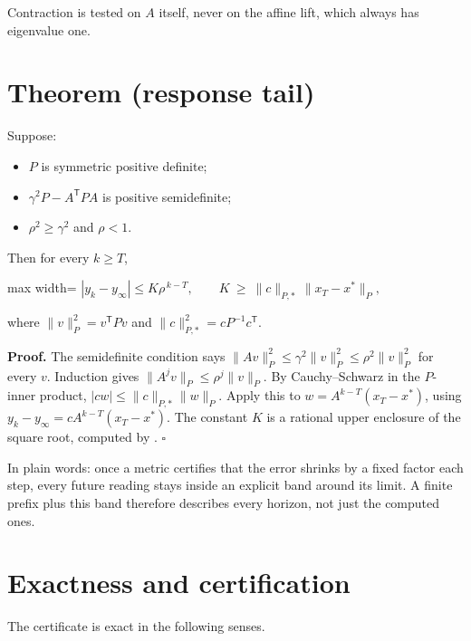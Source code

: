 \documentclass[
  11pt,
  a4paper,
]{report}
\providecommand{\tightlist}{%
  \setlength{\itemsep}{0pt}\setlength{\parskip}{0pt}}
\let\singularitytexttt\texttt
\renewcommand{\texttt}[1]{\singularitytexttt{\seqsplit{#1}}}
\begin{document}
Contraction is tested on \(A\) itself, never on the affine lift, which
always has eigenvalue one.

\hypertarget{theorem-response-tail}{%
\section{Theorem (response tail)}\label{theorem-response-tail}}

Suppose:

\begin{itemize}
\tightlist
\item
  \(P\) is symmetric positive definite;
\item
  \(\gamma^2P-A^{\mathsf T}PA\) is positive semidefinite;
\item
  \(\rho^2\ge\gamma^2\) and \(\rho<1\).
\end{itemize}

Then for every \(k\ge T\),

\begin{center}
\begin{adjustbox}{max width=\linewidth}
$\displaystyle
|y_k-y_\infty|\le K\rho^{\,k-T},\qquad K\ \ge\ \|c\|_{P,*}\,\|x_T-x^*\|_P ,
$
\end{adjustbox}
\end{center}

where \(\|v\|_P^2=v^{\mathsf T}Pv\) and
\(\|c\|_{P,*}^2=cP^{-1}c^{\mathsf T}\).

\textbf{Proof.} The semidefinite condition says
\(\|Av\|_P^2\le\gamma^2\|v\|_P^2\le\rho^2\|v\|_P^2\) for every \(v\).
Induction gives \(\|A^jv\|_P\le\rho^j\|v\|_P\). By Cauchy--Schwarz in
the \(P\)-inner product, \(|cw|\le\|c\|_{P,*}\|w\|_P\). Apply this to
\(w=A^{k-T}(x_T-x^*)\), using \(y_k-y_\infty=cA^{k-T}(x_T-x^*)\). The
constant \(K\) is a rational upper enclosure of the square root,
computed by \texttt{sqrt\_up}. \(\square\)

In plain words: once a metric certifies that the error shrinks by a
fixed factor each step, every future reading stays inside an explicit
band around its limit. A finite prefix plus this band therefore
describes every horizon, not just the computed ones.

\hypertarget{exactness-and-certification}{%
\section{Exactness and
certification}\label{exactness-and-certification}}

The certificate is exact in the following senses.
\end{document}
